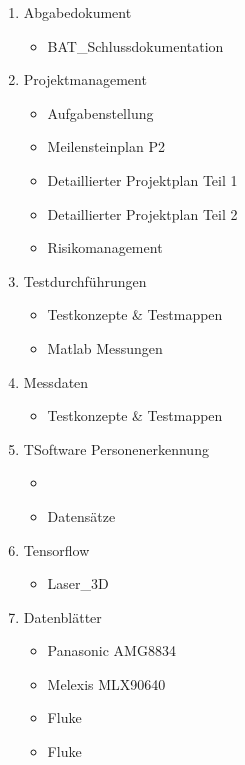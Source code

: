 \begin{enumerate}
	\item Abgabedokument
	\begin{itemize}
		\item BAT\_Schlussdokumentation
	\end{itemize}
	\item Projektmanagement
	\begin{itemize}
		\item Aufgabenstellung
		\item Meilensteinplan P2
		\item Detaillierter Projektplan Teil 1
		\item Detaillierter Projektplan Teil 2
		\item Risikomanagement
	\end{itemize}
	\item Testdurchführungen
	\begin{itemize}
		\item Testkonzepte \& Testmappen
		\item Matlab Messungen
	\end{itemize}
	\item Messdaten
	\begin{itemize}
	\item Testkonzepte \& Testmappen
	\end{itemize}
	\item TSoftware Personenerkennung
	\begin{itemize}
		\item 
		\item Datensätze
	\end{itemize}
	\item Tensorflow
	\begin{itemize}
		\item Laser\_3D
	\end{itemize}
	\item Datenblätter
	\begin{itemize}
		\item Panasonic AMG8834
		\item Melexis MLX90640
		\item Fluke
		\item Fluke 
	\end{itemize}
\end{enumerate}

\newpage




